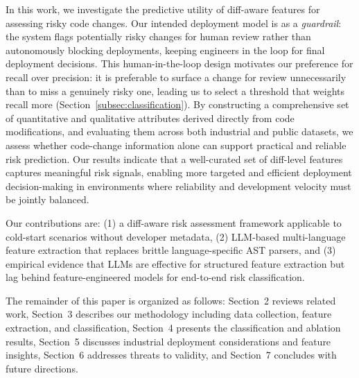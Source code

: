 In this work, we investigate the predictive utility of diff-aware features for assessing risky code changes. Our intended deployment model is as a \emph{guardrail}: the system flags potentially risky changes for human review rather than autonomously blocking deployments, keeping engineers in the loop for final deployment decisions. This human-in-the-loop design motivates our preference for recall over precision: it is preferable to surface a change for review unnecessarily than to miss a genuinely risky one, leading us to select a threshold that weights recall more (Section~\ref{subsec:classification}). By constructing a comprehensive set of quantitative and qualitative attributes derived directly from code modifications, and evaluating them across both industrial and public datasets, we assess whether code-change information alone can support practical and reliable risk prediction. Our results indicate that a well-curated set of diff-level features captures meaningful risk signals, enabling more targeted and efficient deployment decision-making in environments where reliability and development velocity must be jointly balanced.

Our contributions are: (1) a diff-aware risk assessment framework applicable to cold-start scenarios without developer metadata, (2) LLM-based multi-language feature extraction that replaces brittle language-specific AST parsers, and (3) empirical evidence that LLMs are effective for structured feature extraction but lag behind feature-engineered models for end-to-end risk classification.

The remainder of this paper is organized as follows: Section~2 reviews related work, Section~3 describes our methodology including data collection, feature extraction, and classification, Section~4 presents the classification and ablation results, Section~5 discusses industrial deployment considerations and feature insights, Section~6 addresses threats to validity, and Section~7 concludes with future directions.
